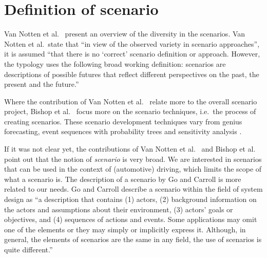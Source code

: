 \documentclass[10pt,final,a4paper,oneside,onecolumn]{article}
\begin{document}
\section{Definition of scenario}

\label{sec:scenario definition}
Van Notten et al.\ \cite{vannotten2003updated} present an overview of the diversity in the scenarios. Van Notten et al.\ state that ``in view of the observed variety in scenario approaches'', it is assumed ``that there is no `correct' scenario definition or approach. However, the typology uses the following broad working definition: scenarios are descriptions of possible futures that reflect different perspectives on the past, the present and the future.''

Where the contribution of Van Notten et al.\ \cite{vannotten2003updated} relate more to the overall scenario project, Bishop et al.\ \cite{bishop2007scentechniques} focus more on the scenario techniques, i.e.\ the process of creating scenarios. These scenario development techniques vary from genius forecasting, event sequences with probability trees and sensitivity analysis \cite{bishop2007scentechniques}.

If it was not clear yet, the contributions of Van Notten et al.\ \cite{vannotten2003updated} and Bishop et al.\ \cite{bishop2007scentechniques} point out that the notion of \emph{scenario} is very broad. We are interested in scenarios that can be used in the context of (automotive) driving, which limits the scope of what a scenario is. The description of a scenario by Go and Carroll \cite{go2004blind} is more related to our needs.
Go and Carroll \cite{go2004blind} describe a scenario within the field of system design as ``a description that contains (1) actors, (2) background information on the actors and assumptions about their environment, (3) actors' goals or objectives, and (4) sequences of actions and events. Some applications may omit one of the elements or they may simply or implicitly express it. Although, in general, the elements of scenarios are the same in any field, the use of scenarios is quite different.'' 
\end{document}
